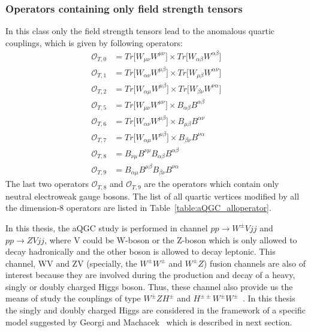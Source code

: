 \subsubsection{Operators containing only field strength tensors} %
\label{ssub:operators_containing_only_field_strength_tensors}
In this class only the field strength tensors lead to the anomalous quartic couplings, which is given by following operators:
\begin{align}
    \mathcal{O}_{T,0} &=Tr\Big[W_{\mu\nu}W^{\mu\nu}\Big]\times Tr\Big[W_{\alpha\beta}W^{\alpha\beta}\Big]\\
    \mathcal{O}_{T,1} &=Tr\Big[W_{\alpha\nu}W^{\mu\beta}\Big]\times Tr\Big[W_{\mu\beta}W^{\alpha\nu}\Big]\\
    \mathcal{O}_{T,2} &=Tr\Big[W_{\alpha\mu}W^{\mu\beta}\Big]\times Tr\Big[W_{\beta\nu}W^{\nu\alpha}\Big]\\
    \mathcal{O}_{T,5} &=Tr\Big[W_{\mu\nu}W^{\mu\nu}\Big]\times B_{\alpha\beta}B^{\alpha\beta}\\
    \mathcal{O}_{T,6} &=Tr\Big[W_{\alpha\nu}W^{\mu\beta}\Big]\times B_{\mu\beta}B^{\alpha\nu}\\
    \mathcal{O}_{T,7} &=Tr\Big[W_{\alpha\mu}W^{\mu\beta}\Big]\times B_{\beta\nu}B^{\nu\alpha}\\
    \mathcal{O}_{T,8} &=B_{\nu\mu}B^{\nu\mu}B_{\alpha\beta}B^{\alpha\beta}\\
    \mathcal{O}_{T,9} &=B_{\alpha\mu}B^{\mu\beta}B_{\beta\nu}B^{\nu\alpha}
\end{align}
The last two operators $\mathcal{O}_{T,8}$ and $\mathcal{O}_{T,9}$ are the operators which contain only neutral electroweak gauge bosons.
The list of all quartic vertices modified by all the dimension-8 operators are listed in Table~\ref{table:aQGC_alloperator}.


In this thesis, the aQGC study is performed in channel $pp\rightarrow W^{\pm}Vjj$ and $pp \rightarrow ZVjj$, where V could be W-boson or the Z-boson which is only allowed to decay hadronically and the other boson is allowed to decay leptonic. This channel, WV and ZV (specially, the $W^\pm W^\pm$ and $W^\pm Z$) fusion channels are also of interest because they are involved during the production and decay of a heavy, singly or doubly charged Higgs boson. Thus, these channel also provide us the means of study the couplings of type $W^\pm Z H^\pm$ and $H^{\pm \pm}W^\pm W^\pm$~\cite{Vega1990}. In this thesis the singly and doubly charged Higgs are considered in the framework of a specific model suggested by Georgi and Machacek~\cite{GEORGI1985463} which is described in next section. 

